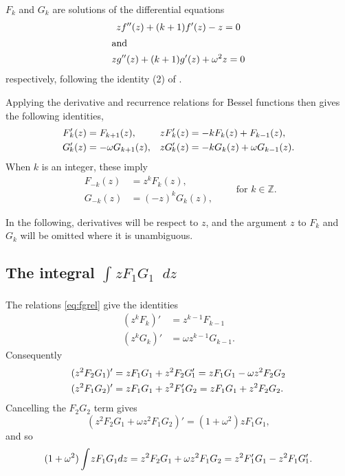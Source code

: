 \documentclass[parskip=half]{scrartcl}
\newcommand{\Int}[2]{\int_{#1}^{#2}\!}
\newcommand{\D}{\mathop{}\!d}
\theoremstyle{nonumberplain}
\begin{document}
$F_k$ and $G_k$ are solutions of the differential equations
\begin{gather}
    z f''(z) + (k+1) f'(z) - z = 0\\
    \intertext{and}
    z g''(z) + (k+1) g'(z) + \omega^2 z = 0
\end{gather}
respectively, following the identity (2) of \autocite[p.~512]{lommel1879}.

Applying the derivative and recurrence relations for Bessel functions
\autocite[\S 10.6, \S10.29]{nistdlmf} then gives the following identities,
\begin{align}
    \label{eq:fgrel}
    \Fp_k(z) &= F_{k+1}(z), & z \Fp_k(z) &= -k F_k(z) + F_{k-1}(z),\\
    \Gp_k(z) &= -\omega G_{k+1}(z), & z \Gp_k(z) &= -k G_k(z) + \omega G_{k-1}(z).
\end{align}
When $k$ is an integer, these imply
\begin{equation}
    \begin{aligned}
        F_{-k}(z) &= z^k F_k(z),\\
        G_{-k}(z) &= (-z)^k G_k(z),
    \end{aligned}
    \qquad \text{for $k\in\mathbb{Z}$}.
\end{equation}

In the following, derivatives will be respect to $z$, and the argument $z$ to
$F_k$ and $G_k$ will be omitted where it is unambiguous.

\subsection*{The integral $\Int{}{} z F_1 G_1 \D z$}

The relations \eqref{eq:fgrel} give the identities
\begin{equation}
    \begin{aligned}
        \label{eq:fgrel2}
        (z^kF_k)' &= z^{k-1}F_{k-1}\\
        (z^kG_k)' &= \omega z^{k-1}G_{k-1}.
    \end{aligned}
\end{equation}
Consequently
\begin{equation}
    \begin{aligned}
        (z^2 F_2 G_1)' &= z F_1 G_1 + z^2 F_2 \Gp_1 = z F_1 G_1 - \omega z^2 F_2 G_2 \\
        (z^2 F_1 G_2)' &= z F_1 G_1 + z^2 \Fp_1 G_2 = z F_1 G_1 + z^2 F_2 G_2.
    \end{aligned}
\end{equation}
Cancelling the $F_2G_2$ term gives
\begin{equation}
    (z^2 F_2 G_1 + \omega z^2 F_1 G_2)' =
    (1+\omega^2) z F_1 G_1,
\end{equation}
and so
\begin{equation}
    (1+\omega^2) \Int{}{} z F_1 G_1 dz = z^2 F_2 G_1 + \omega z^2 F_1 G_2 = z^2 \Fp_1 G_1 - z^2 F_1 \Gp_1.
\end{equation}
\end{document}
